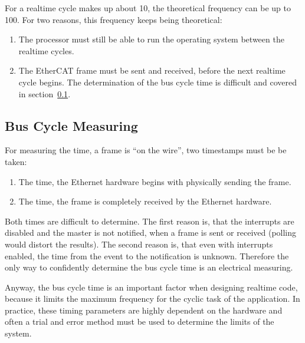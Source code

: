 \documentclass[a4paper,12pt,BCOR6mm,bibtotoc,idxtotoc]{scrbook}
\begin{document}
For a realtime cycle makes up about \unit{10}{\micro\second}, the theoretical
frequency can be up to \unit{100}{\kilo\hertz}. For two reasons, this frequency
keeps being theoretical:

\begin{enumerate}

\item The processor must still be able to run the operating system between the
realtime cycles.

\item The EtherCAT frame must be sent and received, before the next realtime
cycle begins. The determination of the bus cycle time is difficult and covered
in section~\ref{sec:timing-bus}.

\end{enumerate}


\subsection{Bus Cycle Measuring}
\label{sec:timing-bus}

For measuring the time, a frame is ``on the wire'', two timestamps
must be be taken:

\begin{enumerate}
\item The time, the Ethernet hardware begins with physically sending
  the frame.
\item The time, the frame is completely received by the Ethernet
  hardware.
\end{enumerate}

Both times are difficult to determine. The first reason is, that the
interrupts are disabled and the master is not notified, when a frame
is sent or received (polling would distort the results). The second
reason is, that even with interrupts enabled, the time from the event
to the notification is unknown. Therefore the only way to confidently
determine the bus cycle time is an electrical measuring.

Anyway, the bus cycle time is an important factor when designing realtime code,
because it limits the maximum frequency for the cyclic task of the application.
In practice, these timing parameters are highly dependent on the hardware and
often a trial and error method must be used to determine the limits of the
system.
\end{document}
